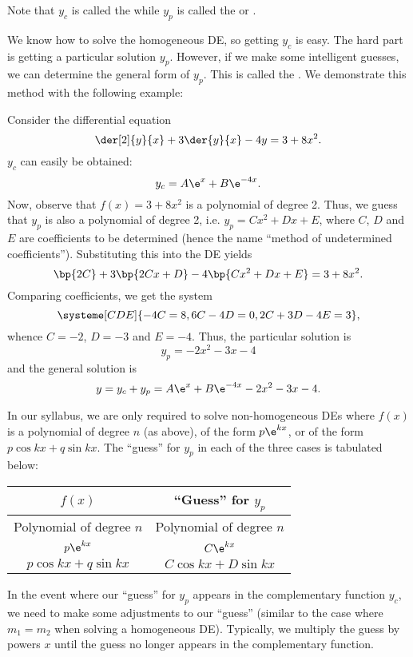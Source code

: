 Note that $y_c$ is called the  while $y_p$ is called the  or .

We know how to solve the homogeneous DE, so getting $y_c$ is easy. The hard part is getting a particular solution $y_p$. However, if we make some intelligent guesses, we can determine the general form of $y_p$. This is called the . We demonstrate this method with the following example:

\begin{example}
    Consider the differential equation \[\der[2]{y}{x} + 3\der{y}{x} - 4y = 3 + 8x^2.\] $y_c$ can easily be obtained: \[y_c = A\e^x + B\e^{-4x}.\] Now, observe that $f(x) = 3 + 8x^2$ is a polynomial of degree 2. Thus, we guess that $y_p$ is also a polynomial of degree 2, i.e. $y_p = Cx^2 + Dx + E$, where $C$, $D$ and $E$ are coefficients to be determined (hence the name ``method of undetermined coefficients''). Substituting this into the DE yields \[\bp{2C} + 3\bp{2Cx + D} - 4\bp{Cx^2 + Dx + E} = 3 + 8x^2.\] Comparing coefficients, we get the system \[\systeme[CDE]{-4C = 8,6C-4D = 0,2C + 3D - 4E = 3},\] whence $C = -2$, $D = -3$ and $E = -4$. Thus, the particular solution is \[y_p = -2x^2 - 3x - 4\] and the general solution is \[y = y_c + y_p = A\e^x + B\e^{-4x} - 2x^2 - 3x - 4.\]
\end{example}

In our syllabus, we are only required to solve non-homogeneous DEs where $f(x)$ is a polynomial of degree $n$ (as above), of the form $p\e^{kx}$, or of the form $p\cos kx + q\sin kx$. The ``guess'' for $y_p$ in each of the three cases is tabulated below:

\begin{table}[H]
    \centering
    \begin{tabular}{|c|c|}
    \hline
    $f(x)$ & \textbf{``Guess'' for $y_p$} \\ \hline\hline
    Polynomial of degree $n$ & Polynomial of degree $n$ \\ \hline
    $p\e^{kx}$ & $C \e^{kx}$ \\ \hline
    $p \cos kx + q \sin kx$ & $C \cos kx + D \sin kx$ \\ \hline
    \end{tabular}
\end{table}

In the event where our ``guess'' for $y_p$ appears in the complementary function $y_c$, we need to make some adjustments to our ``guess'' (similar to the case where $m_1 = m_2$ when solving a homogeneous DE). Typically, we multiply the guess by powers $x$ until the guess no longer appears in the complementary function.

